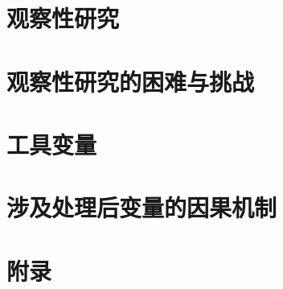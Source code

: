 \documentclass[krantz1]{krantz}
\renewcommand{\theparagraph}{\arabic{chapter}.\arabic{paragraph}}
\begin{document}
   
 
\part{观察性研究}\label{part::observational-studies}
    
   
   
    
      
    
  
\part{观察性研究的困难与挑战}\label{part::challenges-os}  
  
    
    
    
      
          
     

\part{工具变量}\label{part::instrumentalvariables}
    
      
            
       
           

 

\part{涉及处理后变量的因果机制}\label{part::post-treatmentvariable}
 
  
        
         
        



\appendix 
\part{附录}


\renewcommand{\theparagraph}{\Alph{chapter}.\arabic{paragraph}}
  






\backmatter


\printindex
\end{document}
